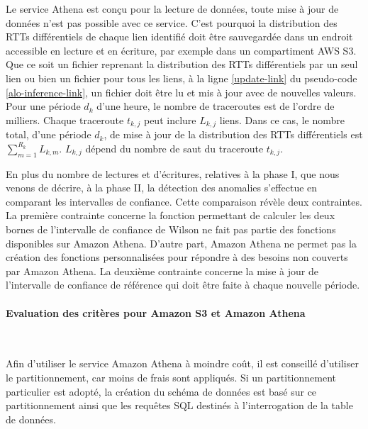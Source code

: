 Le service Athena est conçu pour la lecture de données, toute mise à jour de données n'est pas possible avec ce service. C'est pourquoi la distribution des RTTs différentiels de chaque  lien identifié doit être sauvegardée dans un endroit accessible en lecture et en écriture, par exemple dans un compartiment AWS S3. Que ce soit un fichier reprenant la distribution des RTTs différentiels  par un seul lien ou bien un fichier pour tous les liens,   à la ligne  \ref{update-link} du pseudo-code \ref{alo-inference-link}, un fichier doit être lu et mis à jour avec de nouvelles valeurs. Pour une période $d_k$ d'une heure, le nombre de traceroutes est de l'ordre de milliers. Chaque traceroute $t_{k,j}$ peut inclure $L_{k,j}$ liens. Dans ce cas, le nombre total, d'une période $d_k$, de mise à jour de la distribution des RTTs différentiels est    $ \sum_{m=1}^{R_k}  L_{k,m}$. $ L_{k,j} $ dépend du nombre de saut du  traceroute $t_{k,j}$.


En plus du nombre de lectures et d'écritures, relatives à la phase I, que nous venons de décrire, à la phase II, la détection des anomalies s'effectue en  comparant les intervalles de confiance. Cette comparaison révèle deux contraintes. La première contrainte concerne  la fonction permettant de calculer les deux bornes de l'intervalle de confiance de Wilson ne fait pas partie des fonctions disponibles sur Amazon Athena. D'autre part, Amazon Athena ne permet pas la création des fonctions personnalisées pour répondre à des besoins non couverts par Amazon Athena. La deuxième contrainte concerne la mise à jour de l'intervalle de confiance de référence qui doit être faite à chaque nouvelle période.


\paragraph{Evaluation des critères pour Amazon S3 et Amazon Athena  }~

Afin d'utiliser le service Amazon Athena à moindre coût, il est conseillé d'utiliser le partitionnement, car moins de frais sont appliqués. Si un partitionnement particulier est adopté, la création du schéma de données est basé sur ce partitionnement ainsi que les requêtes SQL destinés à l'interrogation de la table de données.

